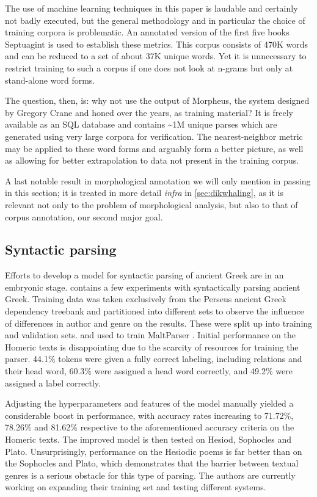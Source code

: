 The use of machine learning techniques in this paper is laudable and
certainly not badly executed, but the general methodology and in
particular the choice of training corpora is problematic. An annotated
version of the first five books Septuagint is used to establish these
metrics. This corpus consists of 470K words and can be reduced to a
set of about 37K unique words. Yet it is unnecessary to restrict
training to such a corpus if one does not look at n-grams but only at
stand-alone word forms. 

The question, then, is: why not use the output of Morpheus, the system
designed by Gregory Crane and honed over the years, as training
material? It is freely available as an SQL database and contains
\textasciitilde1M unique parses which are generated using very large
corpora for verification. The nearest-neighbor metric may be applied
to these word forms and arguably form a better picture, as well as
allowing for better extrapolation to data not present in the training
corpus.

A last notable result \citep{dik2008,dik2009} in morphological
annotation we will only mention in passing in this section; it is
treated in more detail \textit{infra} in \ref{sec:dikwhaling}, as
it is relevant not only to the problem of morphological analysis, but
also to that of corpus annotation, our second major goal.

\subsection{Syntactic parsing}
Efforts to develop a model for syntactic parsing of ancient Greek are
in an embryonic stage. \cite{mambrini2012} contains a few experiments
with syntactically parsing ancient Greek. Training data was taken
exclusively from the Perseus ancient Greek dependency treebank and
partitioned into different sets to observe the influence of
differences in author and genre on the results. These were split up
into training and validation sets. and used to train MaltParser
\citep{nivre2006maltparser}. Initial performance on the Homeric texts
is disappointing due to the scarcity of resources for training the
parser. 44.1\% tokens were given a fully correct labeling, including
relations and their head word, 60.3\% were assigned a head
word correctly, and 49.2\% were assigned a label correctly.

Adjusting the hyperparameters and features of the model manually
yielded a considerable boost in performance, with accuracy rates
increasing to 71.72\%, 78.26\% and 81.62\% respective to the
aforementioned accuracy criteria on the Homeric texts. The improved
model is then tested on Hesiod, Sophocles and Plato. Unsurprisingly,
performance on the Hesiodic poems is far better than on the Sophocles
and Plato, which demonstrates that the barrier between textual genres
is a serious obstacle for this type of parsing. The authors are
currently working on expanding their training set and testing
different systems.

